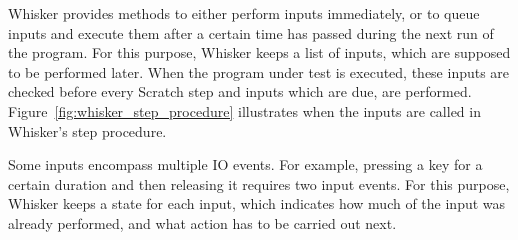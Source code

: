 Whisker provides methods to either perform inputs immediately,
or to queue inputs and execute them after a certain time has passed during the next run of the program.
For this purpose, Whisker keeps a list of inputs, which are supposed to be performed later.
When the program under test is executed, these inputs are checked before every Scratch step
and inputs which are due, are performed.
Figure~\ref{fig:whisker_step_procedure} illustrates when the inputs are called in Whisker's step procedure.
\parspace

Some inputs encompass multiple IO events.
For example, pressing a key for a certain duration and then releasing it requires two input events.
For this purpose, Whisker keeps a state for each input,
which indicates how much of the input was already performed,
and what action has to be carried out next.

